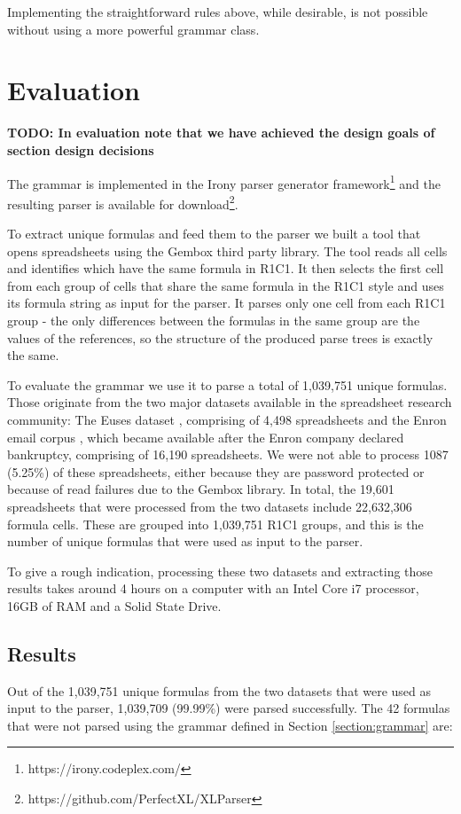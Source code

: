 \documentclass[conference]{IEEEtran}
\newcommand{\todo}[1]{\textbf{TODO: #1}}
\begin{document}
Implementing the straightforward rules above, while desirable, is not possible without using a more powerful grammar class.

\section{Evaluation}
\label{sec:evaluation}

\todo{In evaluation note that we have achieved the design goals of section design decisions}

The grammar is implemented in the Irony parser generator framework\footnote{https://irony.codeplex.com/} and the resulting parser is available for download\footnote{https://github.com/PerfectXL/XLParser}.

To extract unique formulas and feed them to the parser we built a tool that opens spreadsheets using the Gembox third party library. The tool reads all cells and identifies which have the same formula in R1C1. It then selects the first cell from each group of cells that share the same formula in the R1C1 style and uses its formula string as input for the parser. It parses only one cell from each R1C1 group - the only differences between the formulas in the same group are the values of the references, so the structure of the produced parse trees is exactly the same.

To evaluate the grammar we use it to parse a total of 1,039,751 unique formulas. Those originate from the two major datasets available in the spreadsheet research community: The Euses dataset \cite{euses}, comprising of 4,498 spreadsheets and the Enron email corpus \cite{enron}, which became available after the Enron company declared bankruptcy, comprising of 16,190 spreadsheets. We were not able to process 1087 (5.25\%) of these spreadsheets, either because they are password protected or because of read failures due to the Gembox library. In total, the 19,601 spreadsheets that were processed from the two datasets include 22,632,306 formula cells. These are grouped into 1,039,751 R1C1 groups, and this is the number of unique formulas that were used as input to the parser.

To give a rough indication, processing these two datasets and extracting those results takes around 4 hours on a computer with an Intel Core i7 processor, 16GB of RAM and a Solid State Drive.

\subsection{Results}
Out of the 1,039,751 unique formulas from the two datasets that were used as input to the parser, 1,039,709 (99.99\%) were parsed successfully.
The 42 formulas that were not parsed using the grammar defined in Section \ref{section:grammar} are:
\end{document}
